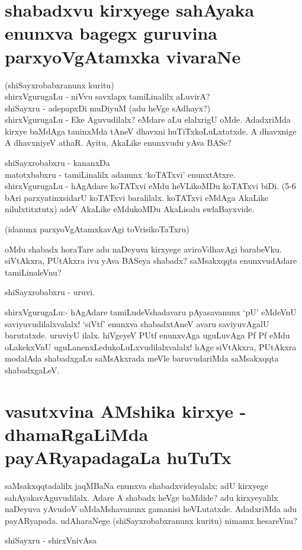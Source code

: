 \section*{shabadxvu kirxyege sahAyaka enunxva bagegx guruvina parxyoVgAtamxka vivaraNe}

(shiSayxrobabxranunx kuritu)\\
shirxVgurugaLu - niVvu savxlapx tamiLinalilx aLuvirA?\\
shiSayxru - adepapxDi muDiyuM (adu heVge sAdhayx?)\\

shirxVgurugaLu - Eke Aguvudilalx? eMdare aLu elalxrigU oMde. AdadxriMda kirxye baMdAga taninxMda tAneV dhavxni huTiTxkoLuLxtatxde. A dhavxnige A dhavxniyeV athaR. Ayitu, AkaLike enunxvudu yAva BASe?

shiSayxrobabxru - kananxDa\\
matotxbabxru - tamiLinalilx adanunx `koTATxvi' enunxtAtxre.\\
shirxVgurugaLu - hAgAdare koTATxvi eMdu heVLikoMDu koTATxvi biDi. (5-6 bAri parxyatinxsidarU koTATxvi baralilalx. koTATxvi eMdAga AkaLike nilulxtitxtutx) adeV AkaLike eMdukoMDu AkaLisalu swlaBayxvide.

(idanunx parxyoVgAtamxkavAgi toVrisikoTaTxru)

oMdu shabadx horaTare adu naDeyuva kirxyege aviroVdhavAgi barabeVku. siVtAkxra, PUtAkxra ivu yAva BASeya shabadx? saMsakxqqta  enunxvudAdare tamiLinaleVnu?

shiSayxrobabxru - uruvi.

shirxVgurugaLu:- hAgAdare tamiLudeVshadavaru pAyasavanunx `pU' eMdeVnU saviyuvudilalxvalalx! `siVtf' enunxva shabadxtAneV avaru saviyuvAgalU barutatxde. uruviyU ilalx. hiVgeyeV PUtf enunxvAga uguLuvAga Pf Pf eMdu oLakekxVnU uguLanenxLedukoLuLxvudilalxvalalx! hAge siVtAkxra, PUtAkxra modalAda shabadxgaLu saMsAkxrada meVle baruvudariMda saMsakxqqta shabadxgaLeV. 

\section*{vasutxvina AMshika kirxye - dhamaRgaLiMda payARyapadagaLa huTuTx }

saMsakxqqtadalilx jaqMBaNa enunxva shabadxvideyalalx; adU kirxyege sahAyakavAguvudilalx. Adare A shabadx heVge baMdide? adu kirxyeyalilx naDeyuva yAvudoV oMdaMshavanunx gamanisi heVLutatxde. AdadxriMda adu payARyapada. udAharaNege (shiSayxrobabxranunx kuritu) nimamx hesareVnu? 

shiSayxru - shirxVnivAsa 


